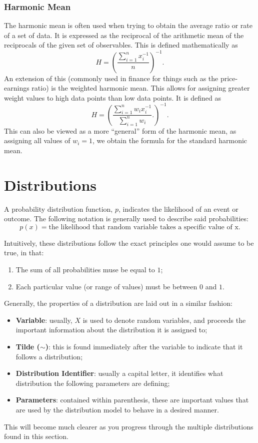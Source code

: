 \documentclass{article}
\begin{document}
\subsubsection{Harmonic Mean}
The harmonic mean is often used when trying to obtain the average ratio or rate of a set of data. It is expressed as the reciprocal of the arithmetic mean of the reciprocals of the given set of observables. This is defined mathematically as
\begin{equation}
    H = \left( \frac{\sum_{i=1}^n x_i^{-1}}{n} \right)^{-1}.
\end{equation}
An extension of this (commonly used in finance for things such as the price-earnings ratio) is the weighted harmonic mean. This allows for assigning greater weight values to high data points than low data points. It is defined as
\begin{equation}
    H = \left( \frac{\sum_{i=1}^n w_i x_i^{-1}}{\sum_{i=1}^n w_i}. \right)^{-1}.
\end{equation}
This can also be viewed as a more ``general'' form of the harmonic mean, as assigning all values of $w_i=1$, we obtain the formula for the standard harmonic mean.

\section{Distributions}
A probability distribution function, $p$, indicates the likelihood of an event or outcome. The following notation is generally used to describe said probabilities:
\begin{equation}
    p(x) = \text{the likelihood that random variable takes a specific value of x}.
\end{equation}

Intuitively, these distributions follow the exact principles one would assume to be true, in that:
\begin{enumerate}
    \item The sum of all probabilities muse be equal to $1$;
    \item Each particular value (or range of values) must be between $0$ and $1$.
\end{enumerate}

Generally, the properties of a distribution are laid out in a similar fashion:
\begin{itemize}
    \item \textbf{Variable}: usually, $X$ is used to denote random variables, and proceeds the important information about the distribution it is assigned to;
    \item \textbf{Tilde ($\mathbf{\sim}$)}: this is found immediately after the variable to indicate that it follows a distribution;
    \item \textbf{Distribution Identifier}: usually a capital letter, it identifies what distribution the following parameters are defining;
    \item \textbf{Parameters}: contained within parenthesis, these are important values that are used by the distribution model to behave in a desired manner.
\end{itemize}
This will become much clearer as you progress through the multiple distributions found in this section.
\end{document}
